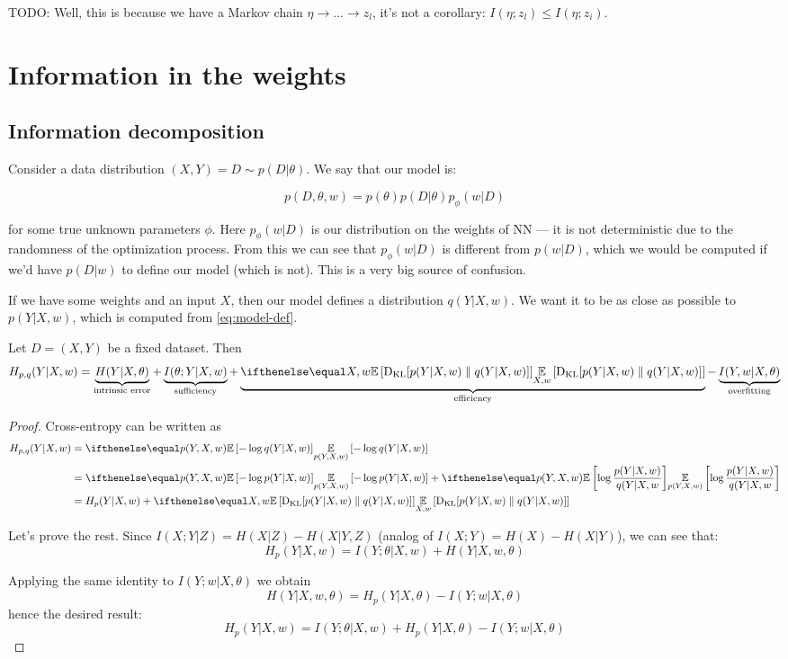\documentclass{article}
\begin{document}
TODO:
Well, this is because we have a Markov chain $\eta \to ... \to z_l$, it's not a corollary:
$I(\eta; z_l) \leq I(\eta; z_i)$.

\section{Information in the weights}
\subsection*{Information decomposition}
Consider a data distribution $(X,Y) = D \sim p(D|\theta)$.
We say that our model is:

\begin{equation}\label{eq:model-def}
p(D, \theta, w) = p(\theta) p(D|\theta) p_\phi(w| D)
\end{equation}

for some true unknown parameters $\phi$.
Here $p_\phi(w|D)$ is our distribution on the weights of NN --- it is not deterministic due to the randomness of the optimization process.
From this we can see that $p_\phi(w|D)$ is different from $p(w|D)$, which we would be computed if we'd have $p(D|w)$ to define our model (which is not).
This is a very big source of confusion.

If we have some weights and an input $X$, then our model defines a distribution $q(Y|X,w)$.
We want it to be as close as possible to $p(Y|X,w)$, which is computed from \eqref{eq:model-def}.

\begin{theorem}
Let $D = (X,Y)$ be a fixed dataset.
Then
\begin{equation}
H_{p,q}(Y|X,w) = \underbrace{H(Y|X,\theta)}_{\text{intrinsic error}} + \underbrace{I(\theta; Y | X,w)}_{\text{sufficiency}} + \underbrace{\expect[X,w]{\kl{p(Y|X,w)}{q(Y|X,w)}}}_{\text{efficiency}} - \underbrace{I(Y,w|X,\theta)}_{\text{overfitting}}
\end{equation}
\end{theorem}

\begin{proof}
Cross-entropy can be written as
\begin{equation}
\begin{split}
H_{p,q}(Y|X,w)
&= \expect[p(Y,X,w)]{-\log q(Y|X,w)}
\\
&= \expect[p(Y,X,w)]{-\log p(Y|X,w)} + \expect[p(Y,X,w)]{\log\frac{p(Y|X,w)}{q(Y|X,w}}
\\
&= H_p(Y|X,w) + \expect[X,w]{\kl{p(Y|X,w)}{q(Y|X,w)}}
\end{split}
\end{equation}

Let's prove the rest.
Since $I(X;Y|Z) = H(X|Z) - H(X|Y,Z)$ (analog of $I(X;Y) = H(X) - H(X|Y)$), we can see that:
\[
H_p(Y|X,w) = I(Y;\theta | X,w) + H(Y|X,w,\theta)
\]

Applying the same identity to $I(Y;w|X,\theta)$ we obtain
\[
H(Y|X,w,\theta) = H_p(Y|X,\theta) - I(Y;w|X,\theta)
\]
hence the desired result:
\[
H_p(Y|X,w) = I(Y;\theta | X,w) + H_p(Y|X,\theta) - I(Y;w|X,\theta)
\]
\end{proof}
\end{document}
